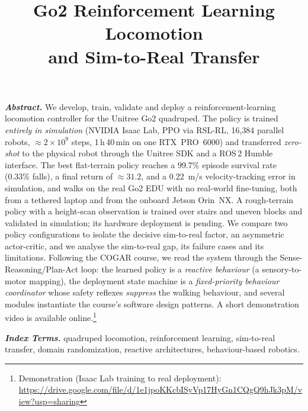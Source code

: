 \documentclass[conference]{IEEEtran}
\begin{document}
\title{Go2 Reinforcement Learning Locomotion\\and Sim-to-Real Transfer}

\author{
}

\maketitle

\noindent\textbf{\textit{Abstract.}}\;
We develop, train, validate and deploy a reinforcement-learning locomotion controller for the
Unitree Go2 quadruped. The policy is trained \emph{entirely in simulation} (NVIDIA Isaac Lab,
PPO via RSL-RL, 16{,}384 parallel robots, ${\approx}2\times10^{9}$ steps, 1\,h\,40\,min on one
RTX~PRO~6000) and transferred \emph{zero-shot} to the physical robot through the Unitree SDK and
a ROS\,2 Humble interface. The best flat-terrain policy reaches a 99.7\% episode survival rate
(0.33\% falls), a final return of ${\approx}31.2$, and a 0.22~m/s velocity-tracking error in
simulation, and walks on the real Go2 EDU with no real-world fine-tuning, both from a tethered
laptop and from the onboard Jetson Orin~NX. A rough-terrain policy with a height-scan
observation is trained over stairs and uneven blocks and validated in simulation; its hardware
deployment is pending. We compare two policy configurations to isolate the decisive sim-to-real
factor, an asymmetric actor-critic, and we analyse the sim-to-real gap, its failure cases and
its limitations. Following the COGAR course, we read the system through the Sense-Reasoning/Plan-Act
loop: the learned policy is a \emph{reactive behaviour} (a sensory-to-motor mapping), the
deployment state machine is a \emph{fixed-priority behaviour coordinator} whose safety reflexes
\emph{suppress} the walking behaviour, and several modules instantiate the course's software
design patterns. A short demonstration video is available online.\footnote{Demonstration (Isaac
Lab training to real deployment): \url{https://drive.google.com/file/d/1e1jpoKKcbISyVp17HyGn1CQgQ9hJk3pM/view?usp=sharing}}

\vspace{4pt}
\noindent\textbf{\textit{Index Terms.}}\;
quadruped locomotion, reinforcement learning, sim-to-real transfer, domain randomization,
reactive architectures, behaviour-based robotics.
\end{document}
